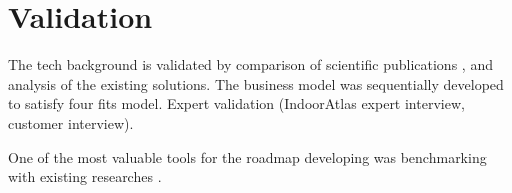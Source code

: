 \section{Validation}


The tech background is validated by comparison of scientific publications \cite{ILA-System-Architecture}, \cite{Brena2017, Kj_fingerprinting, Li_geomagnetic, Mautz2012IndoorPT, AI-Centric_IPS} and analysis of the existing solutions.
The business model was sequentially developed to satisfy four fits model.
Expert validation (IndoorAtlas expert interview, customer interview).

One of the most valuable tools for the roadmap developing was benchmarking with existing researches \cite{microsoft}.
